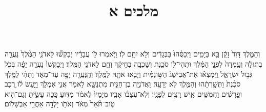 \documentclass{openreader}
\title{מלכים א}
\date{}
\begin{document}
\maketitle
\raggedbottom 
\fontsize{16pt}{24pt}\selectfont


וְהַמֶּ֤לֶךְ דָּוִד֙ זָקֵ֔ן בָּ֖א בַּיָּמִ֑ים וַיְכַסֻּ֨הוּ֙ בַּבְּגָדִ֔ים וְלֹ֥א יִחַ֖ם לֹֽו׃ 
וַיֹּ֧אמְרוּ לֹ֣ו עֲבָדָ֗יו יְבַקְשׁ֞וּ לַאדֹנִ֤י הַמֶּ֨לֶךְ֙ נַעֲרָ֣ה בְתוּלָ֔ה וְעָֽמְדָה֙ לִפְנֵ֣י הַמֶּ֔לֶךְ וּתְהִי־לֹ֖ו סֹכֶ֑נֶת וְשָׁכְבָ֣ה בְחֵיקֶ֔ךָ וְחַ֖ם לַאדֹנִ֥י הַמֶּֽלֶךְ׃ 
וַיְבַקְשׁוּ֙ נַעֲרָ֣ה יָפָ֔ה בְּכֹ֖ל גְּב֣וּל יִשְׂרָאֵ֑ל וַֽיִּמְצְא֗וּ אֶת־אֲבִישַׁג֙ הַשּׁ֣וּנַמִּ֔ית וַיָּבִ֥אוּ אֹתָ֖הּ לַמֶּֽלֶךְ׃ 
וְהַֽנַּעֲרָ֖ה יָפָ֣ה עַד־מְאֹ֑ד וַתְּהִ֨י לַמֶּ֤לֶךְ סֹכֶ֨נֶת֙ וַתְּשָׁ֣רְתֵ֔הוּ וְהַמֶּ֖לֶךְ לֹ֥א יְדָעָֽהּ׃ 
וַאֲדֹנִיָּ֧ה בֶן־חַגִּ֛ית מִתְנַשֵּׂ֥א לֵאמֹ֖ר אֲנִ֣י אֶמְלֹ֑ךְ וַיַּ֣עַשׂ לֹ֗ו רֶ֚כֶב וּפָ֣רָשִׁ֔ים וַחֲמִשִּׁ֥ים אִ֖ישׁ רָצִ֥ים לְפָנָֽיו׃ 
וְלֹֽא־עֲצָבֹ֨ו אָבִ֤יו מִיָּמָיו֙ לֵאמֹ֔ר מַדּ֖וּעַ כָּ֣כָה עָשִׂ֑יתָ וְגַם־ה֤וּא טֹֽוב־תֹּ֨אַר֙ מְאֹ֔ד וְאֹתֹ֥ו יָלְדָ֖ה אַחֲרֵ֥י אַבְשָׁלֹֽום׃ 
\end{document}
